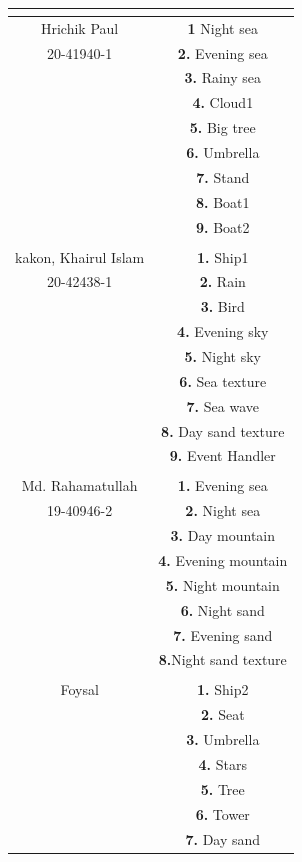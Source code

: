 \documentclass{article}
\begin{document}
\begin{center}
\begin{tabular}{c|c}
    \hline
   \textbf{\color{blue}{Name/ID} }  & \textbf{\color{blue}{Contribution On project} }\\
    \hline
    Hrichik Paul &  \textbf{1} Night sea\\ 
               20-41940-1    &  \textbf{ 2.}	Evening sea\\
                   &   \textbf{3.}	Rainy sea\\
                    & \textbf{ 4.}	Cloud1\\
                    & \textbf{ 5.}	Big tree\\
                   &  \textbf{ 6.}	Umbrella\\
                   &  \textbf{ 7.}	Stand\\
                   &   \textbf{8.}	Boat1\\
                  &   \textbf{ 9.}	Boat2\\
                  \hline \\
    kakon, Khairul Islam & \textbf{1.}	Ship1\\
         20-42438-1        &\textbf{2.}	Rain\\
                 &\textbf{3.}	Bird\\
                 &\textbf{4.}	Evening sky\\
                 &\textbf{5.}	Night sky\\
                 &\textbf{6.}	Sea texture\\
                 &\textbf{7.}	Sea wave\\
                 &\textbf{8.}	Day sand texture\\
                 &\textbf{9.}	Event Handler\\
                 \hline \\
    Md. Rahamatullah & \textbf{1.}	Evening sea \\
           19-40946-2    &\textbf{2.}	Night sea\\
               &\textbf{3.}	Day mountain\\
               &\textbf{4.}	Evening mountain\\
               &\textbf{5.}	Night mountain\\
               &\textbf{6.}	Night sand\\
               &\textbf{7.}	Evening sand\\
               &\textbf{8.}Night sand texture\\
                \hline \\
    Foysal & \textbf{1.}	Ship2\\
             & \textbf{2.}	Seat\\
             & \textbf{3.}	Umbrella\\
             & \textbf{4.}	Stars\\
             & \textbf{5.}	Tree\\
             & \textbf{6.}	Tower\\
             & \textbf{7.}	Day sand\\



\end{tabular}
\end{center}
\end{document}
